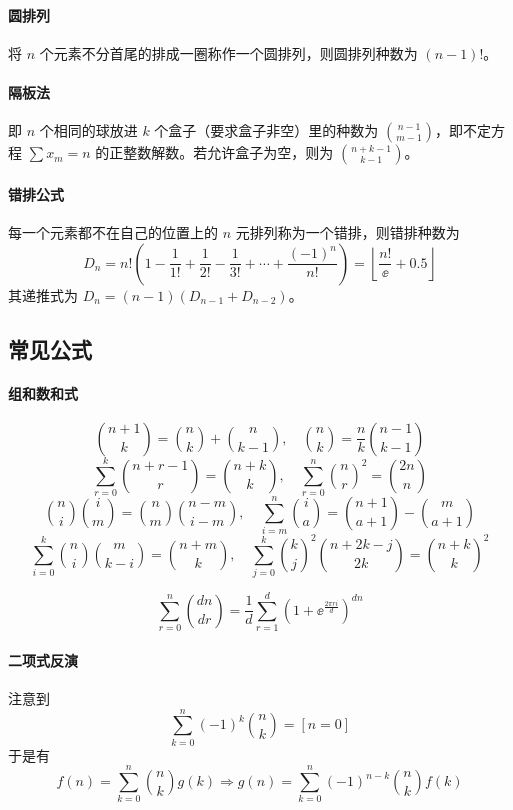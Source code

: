 \documentclass{probook}
\begin{document}
\begin{multicols}{2}
\paragraph{圆排列}
将 $n$ 个元素不分首尾的排成一圈称作一个圆排列，则圆排列种数为 $(n-1)!$。

\paragraph{隔板法}
即 $n$ 个相同的球放进 $k$ 个盒子（要求盒子非空）里的种数为 $\binom{n-1}{m-1}$，即不定方程 $\sum x_m = n$ 的正整数解数。若允许盒子为空，则为 $\binom{n+k-1}{k-1}$。

\paragraph{错排公式}
每一个元素都不在自己的位置上的 $n$ 元排列称为一个错排，则错排种数为
\[ D_n = n! \left( 1 - \frac{1}{1!} + \frac{1}{2!} - \frac{1}{3!} + \cdots + \frac{(-1)^n}{n!} \right) = \left\lfloor \frac{n!}{\ee} + 0.5 \right\rfloor \]
其递推式为 $D_n = (n-1)(D_{n-1} + D_{n-2})$。

\subsection{常见公式}

\paragraph{组和数和式}
\[ \binom{n+1}{k} = \binom{n}{k} + \binom{n}{k-1}, \quad \binom{n}{k} = \frac{n}{k} \binom{n-1}{k-1} \]
\[ \sum\limits_{r=0}^k \binom{n+r-1}{r} = \binom{n+k}{k}, \quad \sum\limits_{r=0}^n \binom{n}{r}^2 = \binom{2n}{n} \]
\[ \binom{n}{i}\binom{i}{m} = \binom{n}{m}\binom{n-m}{i-m}, \quad \sum\limits_{i=m}^n \binom{i}{a} = \binom{n+1}{a+1} - \binom{m}{a+1} \]
\[ \sum\limits_{i=0}^k \binom{n}{i}\binom{m}{k-i} = \binom{n+m}{k}, \quad \sum\limits_{j=0}^k \binom{k}{j}^2 \binom{n+2k-j}{2k} = \binom{n+k}{k}^2 \]

\[ \sum\limits_{r=0}^n \binom{dn}{dr} = \frac{1}{d} \sum_{r=1}^d  \left( 1+\ee^{\tfrac{2\pi r i}{d}} \right)^{dn} \]

\paragraph{二项式反演}

注意到
\[ \sum_{k=0}^n (-1)^k \binom{n}{k} = [n=0] \]
于是有
\[ f(n) = \sum_{k=0}^n \binom{n}{k} g(k) \Rightarrow g(n) = \sum_{k=0}^n (-1)^{n-k}\binom{n}{k} f(k) \]







\end{multicols}
\end{document}
